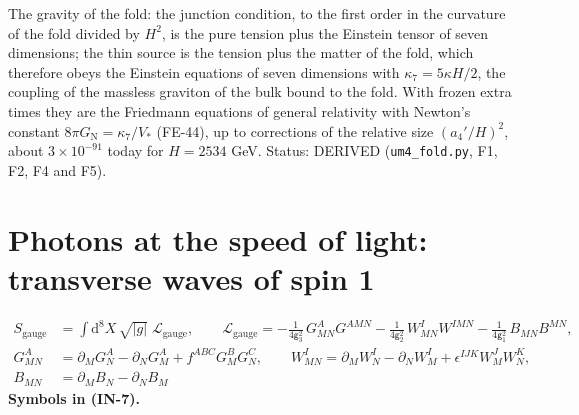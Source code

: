 \documentclass[
  10pt,
]{article}
\begin{document}
The gravity of the fold: the junction condition, to the first order in
the curvature of the fold divided by \(H^2\), is the pure tension plus
the Einstein tensor of seven dimensions; the thin source is the tension
plus the matter of the fold, which therefore obeys the Einstein
equations of seven dimensions with \(\kappa_7 = 5\kappa H/2\), the
coupling of the massless graviton of the bulk bound to the fold. With
frozen extra times they are the Friedmann equations of general
relativity with Newton's constant \(8\pi G_{\mathrm{N}} = \kappa_7/V_*\)
(FE-44), up to corrections of the relative size \((a_4'/H)^2\), about
\(3\times10^{-91}\) today for \(H = 2534\) GeV. Status: DERIVED
(\texttt{um4\_fold.py}, F1, F2, F4 and F5).

\hypertarget{photons-at-the-speed-of-light-transverse-waves-of-spin-1}{%
\section{Photons at the speed of light: transverse waves of spin
1}\label{photons-at-the-speed-of-light-transverse-waves-of-spin-1}}

\[
\begin{aligned}
S_{\mathrm{gauge}} &= \int\mathrm{d}^8X\,\sqrt{\lvert g\rvert}\;\mathcal{L}_{\mathrm{gauge}},\qquad
\mathcal{L}_{\mathrm{gauge}} = -\frac{1}{4\mathsf{g}_3^2}\,G^A_{MN}G^{AMN} - \frac{1}{4\mathsf{g}_2^2}\,W^I_{MN}W^{IMN}
 - \frac{1}{4\mathsf{g}_1^2}\,B_{MN}B^{MN},\\
G^A_{MN} &= \partial_MG^A_N - \partial_NG^A_M + f^{ABC}G^B_MG^C_N,\qquad
W^I_{MN} = \partial_MW^I_N - \partial_NW^I_M + \epsilon^{IJK}W^J_MW^K_N,\\
B_{MN} &= \partial_MB_N - \partial_NB_M
\end{aligned} \tag{IN-7}
\] \textbf{Symbols in (IN-7).}
\end{document}
